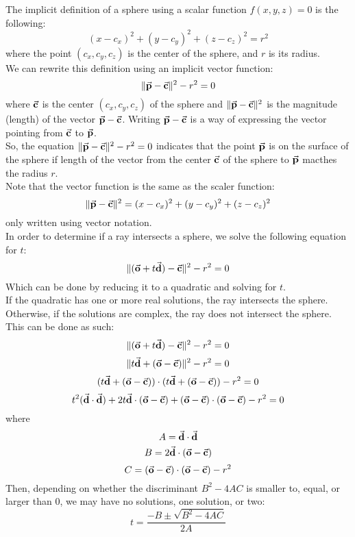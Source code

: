 \documentclass[12pt]{article}
\begin{document}
    The implicit definition of a sphere
    using a scalar function $f(x, y, z) = 0$ is the following:
    \[
        (x - c_x)^2 +  (y - c_y)^2 +  (z - c_z)^2 = r^2 
    \]
    where the point $(c_x, c_y, c_z)$
    is the center of the sphere,
    and $r$ is its radius. \\

    We can rewrite this definition using an
    implicit vector function:
    \[ \| \vec{\mathbf{p}} - \vec{\mathbf{c}} \|^2 - r^2 = 0 \]
    where $\vec{\mathbf{c}}$
    is the center $(c_x, c_y, c_z)$ of the sphere
    and $\|\vec{\mathbf{p}} - \vec{\mathbf{c}} \|^2$ is the magnitude (length)
    of the vector $\vec{\mathbf{p}} - \vec{\mathbf{c}}$.
    Writing $\vec{\mathbf{p}} - \vec{\mathbf{c}}$ is a way of expressing
    the vector pointing from $\vec{\mathbf{c}}$ to $\vec{\mathbf{p}}$. \\
    So, the equation 
    $\| \vec{\mathbf{p}} - \vec{\mathbf{c}} \|^2 - r^2 = 0$
    indicates that the point $\vec{\mathbf{p}}$ is
    on the surface of the sphere
    if length of the vector
    from the center $\vec{\mathbf{c}}$ of the sphere
    to $\vec{\mathbf{p}}$ macthes the radius $r$. \\
    Note that the vector function
    is the same as the scaler function:
    \[ 
        \| \vec{\mathbf{p}} - \vec{\mathbf{c}} \|^2
        = (x - c_x)^2 
        + (y - c_y)^2 +  (z - c_z)^2
    \]
    only written using vector notation. \\

    In order to determine if a ray intersects a sphere,
    we solve the following equation for $t$:
    \[ 
        \| (\vec{\mathbf{o}} + t\vec{\mathbf{d}}) - \vec{\mathbf{c}} \|^2 - r^2 = 0
    \]
    Which can be done by reducing it to a quadratic
    and solving for $t$. \\
    If the quadratic has one or more real solutions,
    the ray intersects the sphere. \\
    Otherwise, if the solutions are complex,
    the ray does not intersect the sphere. \\

    This can be done as such:
    \[ 
        \| (\vec{\mathbf{o}} + t\vec{\mathbf{d}}) - \vec{\mathbf{c}} \|^2 - r^2 = 0
    \]
    \[ 
        \| t\vec{\mathbf{d}} + (\vec{\mathbf{o}} - \vec{\mathbf{c}}) \|^2 - r^2 = 0
    \]
    \[ 
        (t\vec{\mathbf{d}} + (\vec{\mathbf{o}} - \vec{\mathbf{c}})) \cdot
        (t\vec{\mathbf{d}} + (\vec{\mathbf{o}} - \vec{\mathbf{c}})) - r^2 = 0
    \]
    \[ 
        t^2(\vec{\mathbf{d}} \cdot \vec{\mathbf{d}}) 
        + 2t\vec{\mathbf{d}} \cdot (\vec{\mathbf{o}} - \vec{\mathbf{c}})
        + (\vec{\mathbf{o}} - \vec{\mathbf{c}})\cdot(\vec{\mathbf{o}} - \vec{\mathbf{c}}) - r^2 = 0
    \]
    where 
    \[ A = \vec{\mathbf{d}} \cdot \vec{\mathbf{d}} \]
    \[ B = 2\vec{\mathbf{d}} \cdot (\vec{\mathbf{o}} - \vec{\mathbf{c}}) \]
    \[ C = (\vec{\mathbf{o}} - \vec{\mathbf{c}})\cdot(\vec{\mathbf{o}} - \vec{\mathbf{c}}) - r^2 \]
    Then, depending on whether the discriminant
    $B^2  -4AC$
    is smaller to, equal, or larger than 0,
    we may have no solutions, one solution, or two:
    \[ t = \dfrac{-B \pm \sqrt{B^2 - 4AC} }{2A} \]
\end{document}
